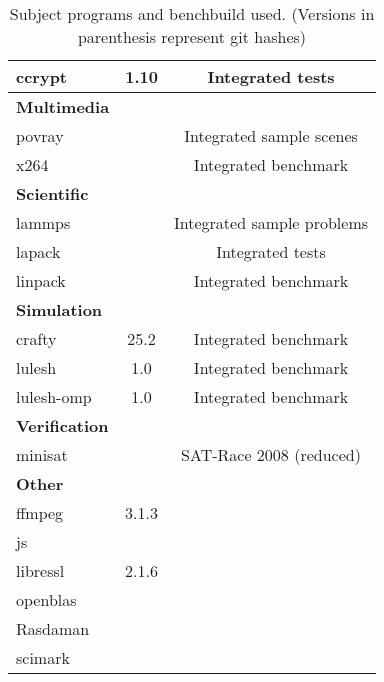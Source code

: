 \begin{table}[H]
{\begin{minipage}{\textwidth}
\begin{tabularx}{\textwidth}{lcC}
                ccrypt & 1.10 & Integrated tests\\
                \midrule
                \textbf{Multimedia}\\
                povray &  & Integrated sample scenes\\
                x264 &  & Integrated benchmark\\
                \midrule
                \textbf{Scientific}\\
                lammps &  & Integrated sample problems\\
                lapack & & Integrated tests\\
                linpack & & Integrated benchmark\\
                \midrule
                \textbf{Simulation}\\
                crafty & 25.2 & Integrated benchmark\\
                lulesh & 1.0 & Integrated benchmark\\
                lulesh-omp & 1.0 & Integrated benchmark\\
                \midrule
                \textbf{Verification}\\
                minisat &  & SAT-Race 2008 (reduced)\\
                \midrule
                \textbf{Other}\\
                ffmpeg & 3.1.3\\
                js\\
                libressl & 2.1.6\\
                openblas & \\
                Rasdaman & \\
                scimark  & \\
                \bottomrule
            \end{tabularx}
            \caption[Subject programs]{Subject programs and benchbuild used. (Versions in parenthesis represent git hashes)}
        \end{minipage}
    }
\end{table}

